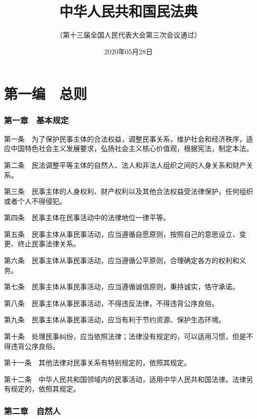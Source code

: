 \documentclass[UTF8,12pt,a4paper]{ctexbook}
\begin{document}
\title{中华人民共和国民法典}
\author{（第十三届全国人民代表大会第三次会议通过）}
\date{2020年05月28日}
\maketitle

\tableofcontents

\mainmatter

\cleardoublepage
{}
\part*{第一编　总则}


\section*{第一章　基本规定}

第一条　为了保护民事主体的合法权益，调整民事关系，维护社会和经济秩序，适应中国特色社会主义发展要求，弘扬社会主义核心价值观，根据宪法，制定本法。

第二条　民法调整平等主体的自然人、法人和非法人组织之间的人身关系和财产关系。

第三条　民事主体的人身权利、财产权利以及其他合法权益受法律保护，任何组织或者个人不得侵犯。

第四条　民事主体在民事活动中的法律地位一律平等。

第五条　民事主体从事民事活动，应当遵循自愿原则，按照自己的意思设立、变更、终止民事法律关系。

第六条　民事主体从事民事活动，应当遵循公平原则，合理确定各方的权利和义务。

第七条　民事主体从事民事活动，应当遵循诚信原则，秉持诚实，恪守承诺。

第八条　民事主体从事民事活动，不得违反法律，不得违背公序良俗。

第九条　民事主体从事民事活动，应当有利于节约资源、保护生态环境。

第十条　处理民事纠纷，应当依照法律；法律没有规定的，可以适用习惯，但是不得违背公序良俗。

第十一条　其他法律对民事关系有特别规定的，依照其规定。

第十二条　中华人民共和国领域内的民事活动，适用中华人民共和国法律。法律另有规定的，依照其规定。

\section*{第二章　自然人}
\end{document}
